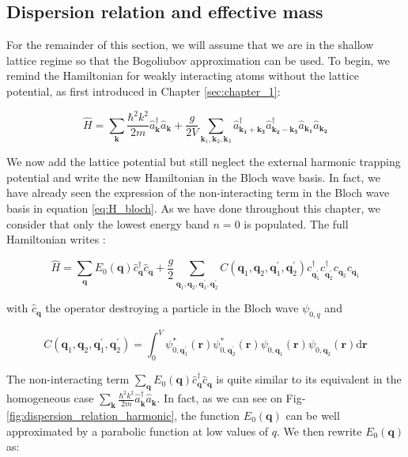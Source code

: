 \subsection{Dispersion relation and effective mass}

For the remainder of this section, we will assume that we are in the shallow lattice regime so that the Bogoliubov approximation can be used. To begin, we remind the Hamiltonian for weakly interacting atoms without the lattice potential, as first introduced in Chapter \ref{sec:chapter_1}:

\begin{equation}
    \hat{H}=\sum_{\bm{k}}\frac{\hbar^2 k^2}{2m} \hat{a}^{\dagger}_{\bm{k}}  \hat{a}_{\bm{k}} +  \frac{g}{2V} \sum_{\bm{k}_1,\bm{k}_2,\bm{k}_3} \hat{a}^{\dagger}_{\bm{k_1}+\bm{k_3}} \hat{a}^{\dagger}_{\bm{k_2}-\bm{k_3}} \hat{a}_{\bm{k_1}} \hat{a}_{\bm{k_2}} 
\end{equation}

\noindent We now add the lattice potential but still neglect the external harmonic trapping potential and write the new Hamiltonian in the Bloch wave basis. In fact, we have already seen the expression of the non-interacting term in the Bloch wave basis in equation \ref{eq:H_bloch}. As we have done throughout this chapter, we consider that only the lowest energy band $n=0$ is populated. The full Hamiltonian writes \cite{dalibard2013cages}:

\begin{equation}
    \hat{H}=\sum_{\bm{q}} E_{0}(\bm{q}) \hat{c}_{\bm{q}}^{\dagger} \hat{c}_{\bm{q}}+\frac{g}{2} \sum_{\bm{q}_{1}, \bm{q}_{2}, \bm{q}_{1}^{\prime}, \bm{q}_{2}^{\prime}} C\left(\bm{q}_{1}, \bm{q}_{2}, \bm{q}_{1}^{\prime}, \bm{q}_{2}^{\prime}\right) c_{\bm{q}_{1}^{\prime}}^{\dagger} c_{\bm{q}_{2}^{\prime}}^{\dagger} c_{\bm{q}_{2}} c_{\bm{q}_{1}}
    \label{eq:lattice_bogo_hamiltonian}
\end{equation}

\noindent with $\hat{c}_{\bm{q}}$ the operator destroying a particle in the Bloch wave $\psi_{0,q}$ and 


\begin{equation}
    C\left(\bm{q}_{1}, \bm{q}_{2}, \bm{q}_{1}^{\prime}, \bm{q}_{2}^{\prime}\right)=\int_{0}^{V} \psi_{0, \bm{q}_{1}^{\prime}}^{*}(\bm{r}) \psi_{0, \bm{q}_{2}^{\prime}}^{*}(\bm{r}) \psi_{0, \bm{q}_{1}}(\bm{r}) \psi_{0, \bm{\bm{q}}_{2}}(\bm{r}) \mathrm{d} \bm{r}
\end{equation}

The non-interacting term $\sum_{\bm{q}} E_{0}(\bm{q}) \hat{c}_{\bm{q}}^{\dagger} \hat{c}_{\bm{q}}$ is quite similar to its equivalent in the homogeneous case $\sum_{\bm{k}}\frac{\hbar^2 k^2}{2m} \hat{a}^{\dagger}_{\bm{k}}  \hat{a}_{\bm{k}}$. In fact, as we can see on Fig-\ref{fig:dispersion_relation_harmonic}, the function $E_{0}(\bm{q})$ can be well approximated by a parabolic function at low values of $q$. We then rewrite $E_{0}(\bm{q})$ as:

